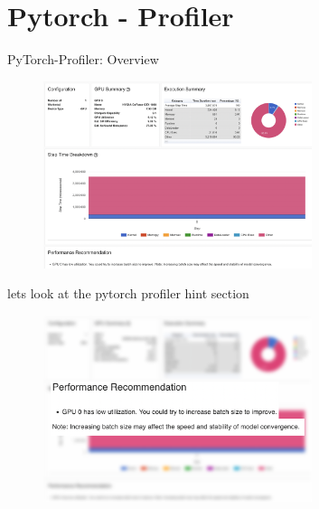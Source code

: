 \documentclass[compress,aspectratio=169]{beamer}
\begin{document}
\section{Pytorch - Profiler}

\begin{frame}{PyTorch-Profiler: Overview}
	\vspace{-1em}
\begin{center}
    \begin{figure}
        \includegraphics[width=0.7\textwidth]{../../data/scap_gtx1080_profiler-torch_14650076}
    \end{figure}
\end{center}

\end{frame}

\begin{frame}{lets look at the pytorch profiler hint section}

\begin{center}
    \begin{figure}
        \includegraphics[width=0.7\textwidth]{../../data/scap_gtx1080_profiler-torch_14650076_zoom}
    \end{figure}
\end{center}

\end{frame}
\end{document}
